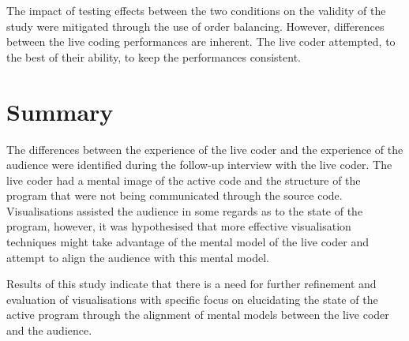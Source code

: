 The impact of testing effects between the two conditions on the validity of the study were mitigated through the use of order balancing. However, differences between the live coding performances are inherent. The live coder attempted, to the best of their ability, to keep the performances consistent.

\section{Summary}

The differences between the experience of the live coder and the experience of the audience were identified during the follow-up interview with the live coder. The live coder had a mental image of the active code and the structure of the program that were not being communicated through the source code. Visualisations assisted the audience in some regards as to the state of the program, however, it was hypothesised that more effective visualisation techniques might take advantage of the mental model of the live coder and attempt to align the audience with this mental model.

Results of this study indicate that there is a need for further refinement and evaluation of visualisations with specific focus on elucidating the state of the active program through the alignment of mental models between the live coder and the audience.





